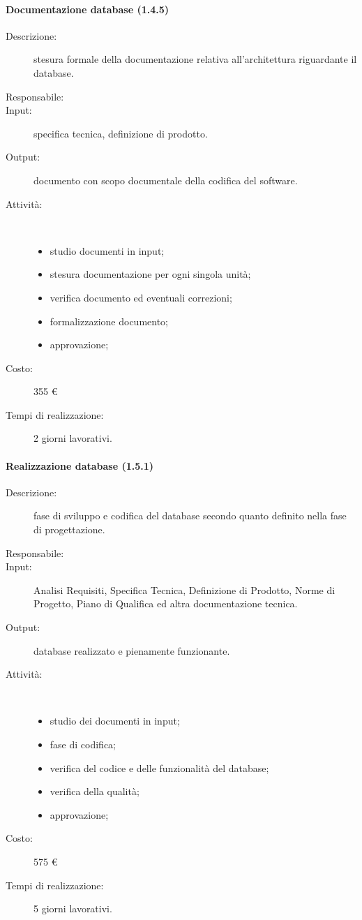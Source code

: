 \paragraph{Documentazione database (1.4.5)}
\begin{description}
\item[Descrizione:] stesura formale della documentazione relativa all'architettura riguardante il database.
\item[Responsabile:] 
\item[Input:] specifica tecnica, definizione di prodotto.
\item[Output:] documento con scopo documentale della codifica del software.
\item[Attività:]\mbox{}\\[-1.5\baselineskip]
	\begin{itemize}
	\item studio documenti in input;
	\item stesura documentazione per ogni singola unità;
	\item verifica documento ed eventuali correzioni;
	\item formalizzazione documento;
	\item approvazione;
	\end{itemize}
\item[Costo:] 355 \euro{}
\item[Tempi di realizzazione:] 2 giorni lavorativi.
\end{description}

\paragraph{Realizzazione database (1.5.1)}
\begin{description}
\item[Descrizione:] fase di sviluppo e codifica del database secondo quanto definito nella fase di progettazione.
\item[Responsabile:] 
\item[Input:] Analisi Requisiti, Specifica Tecnica, Definizione di Prodotto, Norme di Progetto, Piano di Qualifica ed altra documentazione tecnica.
\item[Output:]database realizzato e pienamente funzionante.
\item[Attività:]\mbox{}\\[-1.5\baselineskip]
	\begin{itemize}
	\item studio dei documenti in input;
	\item fase di codifica;
	\item verifica del codice e delle funzionalit\`{a} del database;
	\item verifica della qualit\`{a};
	\item approvazione;
	\end{itemize}
\item[Costo:] 575 \euro{}
\item[Tempi di realizzazione:] 5 giorni lavorativi.
\end{description}

